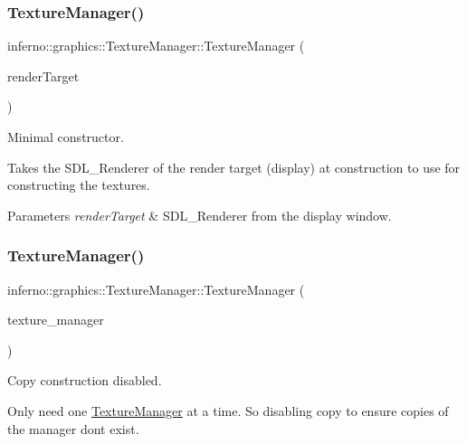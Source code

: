 \subsubsection{\texorpdfstring{Texture\+Manager()}{TextureManager()}\hspace{0.1cm}{\footnotesize\ttfamily [1/3]}}
{\footnotesize\ttfamily inferno\+::graphics\+::\+Texture\+Manager\+::\+Texture\+Manager (\begin{DoxyParamCaption}\item[{S\+D\+L\+\_\+\+Renderer $\ast$}]{render\+Target }\end{DoxyParamCaption})\hspace{0.3cm}{\ttfamily [inline]}}



Minimal constructor. 

Takes the S\+D\+L\+\_\+\+Renderer of the render target (display) at construction to use for constructing the textures. 
\begin{DoxyParams}{Parameters}
{\em render\+Target} & S\+D\+L\+\_\+\+Renderer from the display window. \\
\hline
\end{DoxyParams}
\mbox{\label{classinferno_1_1graphics_1_1_texture_manager_a6aaf05d68384081740e7b59752f5ea86}} 
\subsubsection{\texorpdfstring{Texture\+Manager()}{TextureManager()}\hspace{0.1cm}{\footnotesize\ttfamily [2/3]}}
{\footnotesize\ttfamily inferno\+::graphics\+::\+Texture\+Manager\+::\+Texture\+Manager (\begin{DoxyParamCaption}\item[{const \mbox{\hyperlink{classinferno_1_1graphics_1_1_texture_manager}{Texture\+Manager}} \&}]{texture\+\_\+manager }\end{DoxyParamCaption})\hspace{0.3cm}{\ttfamily [delete]}}



Copy construction disabled. 

Only need one \mbox{\hyperlink{classinferno_1_1graphics_1_1_texture_manager}{Texture\+Manager}} at a time. So disabling copy to ensure copies of the manager don\textquotesingle{}t exist. \mbox{\label{classinferno_1_1graphics_1_1_texture_manager_a91ac9443d92df72ecedee3cf16401965}} 
